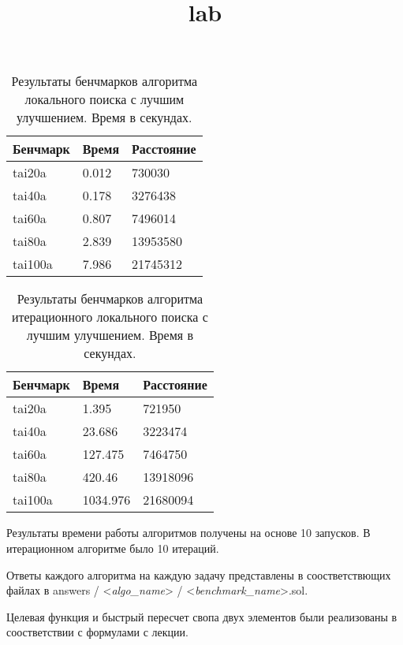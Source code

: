 \documentclass{article}
\title{lab}
\author{}
\date{}
\begin{document}
\setlength{\parindent}{35pt}
\setlength{\footnotemargin}{5pt}
\sloppy
\frenchspacing %



\begin{table}[!h]
    \begin{center}
        \begin{tabular}{ | m{4.2em} | m{5em} | m{5em} |}
            \hline
            Бенчмарк & Время & Расстояние \\
            \hline
            tai20a   & 0.012 & 730030     \\
            \hline
            tai40a   & 0.178 & 3276438    \\
            \hline
            tai60a   & 0.807 & 7496014    \\
            \hline
            tai80a   & 2.839 & 13953580   \\
            \hline
            tai100a  & 7.986 & 21745312   \\
            \hline
        \end{tabular}
        \caption{Результаты бенчмарков алгоритма локального поиска с лучшим улучшением. Время в секундах.}
    \end{center}
\end{table}

\begin{table}[!h]
    \begin{center}
        \begin{tabular}{ | m{4.2em} | m{5em} | m{5em} |}
            \hline
            Бенчмарк & Время    & Расстояние \\
            \hline
            tai20a   & 1.395    & 721950     \\
            \hline
            tai40a   & 23.686   & 3223474    \\
            \hline
            tai60a   & 127.475  & 7464750    \\
            \hline
            tai80a   & 420.46   & 13918096   \\
            \hline
            tai100a  & 1034.976 & 21680094   \\
            \hline
        \end{tabular}
        \caption{Результаты бенчмарков алгоритма итерационного локального поиска с лучшим улучшением. Время в секундах.}
    \end{center}
\end{table}

Результаты времени работы алгоритмов получены на основе 10 запусков.
В итерационном алгоритме было 10 итераций.

Ответы каждого алгоритма на каждую задачу представлены в соостветствющих файлах в
answers / <\textit{algo\_name}> / <\textit{benchmark\_name}>.sol.

Целевая функция и быстрый пересчет свопа двух элементов были реализованы в соостветствии с формулами с лекции.
\end{document}
